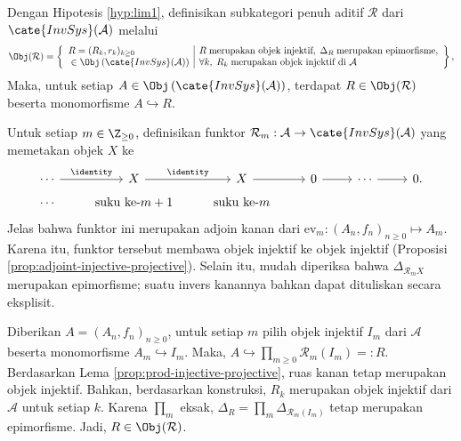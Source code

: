 \begin{lema}\label{prop:lim1-prep}
Dengan Hipotesis \ref{hyp:lim1}, definisikan subkategori penuh aditif
$\mathcal{R}$ dari $\cate{InvSys}(\mathcal{A})$ melalui
\[ \Obj(\mathcal{R}) = \left\{\begin{array}{l|l}
		R = (R_k, r_k)_{k \geq 0} & R \;\text{merupakan objek injektif}, \; \Delta_R \;\text{merupakan epimorfisme}, \\
		\; \in \Obj\left( \cate{InvSys}(\mathcal{A}) \right) & \forall k, \; R_k \;\text{merupakan objek injektif di $\mathcal{A}$}
\end{array}\right\}, \]
Maka, untuk setiap
$A \in \Obj\left(\cate{InvSys}(\mathcal{A})\right)$, terdapat
$R \in \Obj(\mathcal{R})$ beserta monomorfisme $A \hookrightarrow R$.
\end{lema}

\begin{bukti}
Untuk setiap $m \in \Z_{\geq 0}$, definisikan funktor
$\mathcal{R}_m: \mathcal{A} \to \cate{InvSys}(\mathcal{A})$ yang
memetakan objek $X$ ke
\begin{equation}\label{eqn:Rm-construction}\begin{tikzcd}[row sep=tiny]
		\cdots \arrow[r, "{\identity}"] & X \arrow[r, "{\identity}"] & X \arrow[r] & 0 \arrow[r] & \cdots \arrow[r] & 0. \\
		\cdots & \text{suku ke-$m+1$} & \text{suku ke-$m$} & & &
\end{tikzcd}\end{equation}
Jelas bahwa funktor ini merupakan adjoin kanan dari
$\mathrm{ev}_m: (A_n, f_n)_{n \geq 0} \mapsto A_m$. Karena itu,
funktor tersebut membawa objek injektif ke objek injektif
(Proposisi \ref{prop:adjoint-injective-projective}). Selain itu, mudah
diperiksa bahwa $\Delta_{\mathcal{R}_m X}$ merupakan epimorfisme; suatu
invers kanannya bahkan dapat dituliskan secara eksplisit.

Diberikan $A = (A_n, f_n)_{n \geq 0}$, untuk setiap $m$ pilih objek
injektif $I_m$ dari $\mathcal{A}$ beserta monomorfisme
$A_m \hookrightarrow I_m$. Maka,
$A \hookrightarrow \prod_{m \geq 0} \mathcal{R}_m (I_m) =: R$.
Berdasarkan Lema \ref{prop:prod-injective-projective}, ruas kanan tetap
merupakan objek injektif. Bahkan, berdasarkan konstruksi, $R_k$
merupakan objek injektif dari $\mathcal{A}$ untuk setiap $k$. Karena
$\prod_m$ eksak,
$\Delta_R = \prod_m \Delta_{\mathcal{R}_m(I_m)}$ tetap merupakan
epimorfisme. Jadi, $R \in \Obj(\mathcal{R})$.
\end{bukti}

